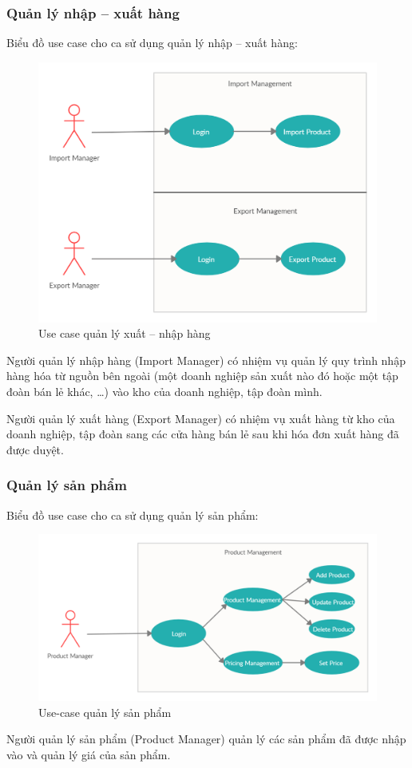 \subsubsection{Quản lý nhập – xuất hàng}
Biểu đồ use case cho ca sử dụng quản lý nhập – xuất hàng:
\begin{figure}[H]
\centering
\includegraphics[width=14cm]{images/use-case/import-export.jpg}
\caption{Use case quản lý xuất – nhập hàng}
\end{figure}

Người quản lý nhập hàng (Import Manager) có nhiệm vụ quản lý quy
trình nhập hàng hóa từ nguồn bên ngoài (một doanh nghiệp sản xuất
nào đó hoặc một tập đoàn bán lẻ khác, …) vào kho của doanh nghiệp,
tập đoàn mình. 

Người quản lý xuất hàng (Export Manager) có nhiệm vụ xuất hàng từ
kho của doanh nghiệp, tập đoàn sang các cửa hàng bán lẻ sau khi hóa
đơn xuất hàng đã được duyệt.

\subsubsection{Quản lý sản phẩm}
Biểu đồ use case cho ca sử dụng quản lý sản phẩm:
\begin{figure}[H]
\centering
\includegraphics[width=14cm]{images/use-case/product-management.jpg}
\caption{Use-case quản lý sản phẩm}
\end{figure}
Người quản lý sản phẩm (Product Manager) quản lý các sản phẩm
đã được nhập vào và quản lý giá của sản phẩm. 

